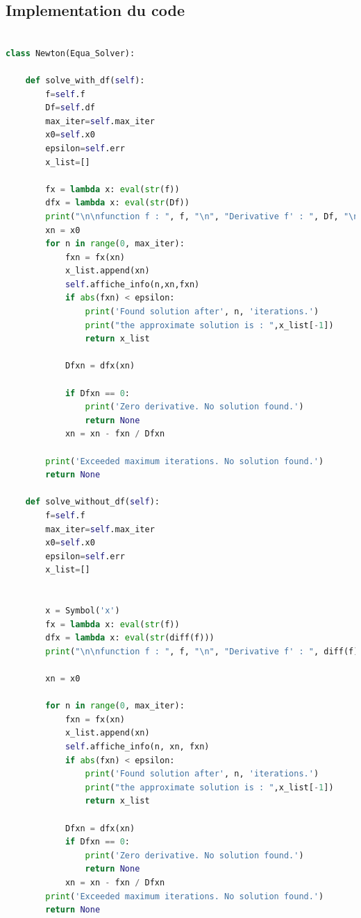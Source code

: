\documentclass{article}
\begin{document}
\subsection{Implementation du code}
\begin{lstlisting}[language=Python, caption=Méthode de Newton en Python]

class Newton(Equa_Solver):

    def solve_with_df(self):
        f=self.f
        Df=self.df
        max_iter=self.max_iter
        x0=self.x0
        epsilon=self.err
        x_list=[]

        fx = lambda x: eval(str(f))
        dfx = lambda x: eval(str(Df))
        print("\n\nfunction f : ", f, "\n", "Derivative f' : ", Df, "\n", "--------------------------------")
        xn = x0
        for n in range(0, max_iter):
            fxn = fx(xn)
            x_list.append(xn)
            self.affiche_info(n,xn,fxn)
            if abs(fxn) < epsilon:
                print('Found solution after', n, 'iterations.')
                print("the approximate solution is : ",x_list[-1])
                return x_list

            Dfxn = dfx(xn)

            if Dfxn == 0:
                print('Zero derivative. No solution found.')
                return None
            xn = xn - fxn / Dfxn

        print('Exceeded maximum iterations. No solution found.')
        return None
        
    def solve_without_df(self):
        f=self.f
        max_iter=self.max_iter
        x0=self.x0
        epsilon=self.err
        x_list=[]


        x = Symbol('x')
        fx = lambda x: eval(str(f))
        dfx = lambda x: eval(str(diff(f)))
        print("\n\nfunction f : ", f, "\n", "Derivative f' : ", diff(f), "\n", "--------------------------------")

        xn = x0

        for n in range(0, max_iter):
            fxn = fx(xn)
            x_list.append(xn)
            self.affiche_info(n, xn, fxn)
            if abs(fxn) < epsilon:
                print('Found solution after', n, 'iterations.')
                print("the approximate solution is : ",x_list[-1])
                return x_list
                
            Dfxn = dfx(xn)
            if Dfxn == 0:
                print('Zero derivative. No solution found.')
                return None
            xn = xn - fxn / Dfxn
        print('Exceeded maximum iterations. No solution found.')
        return None
\end{lstlisting}
\newpage
\end{document}
